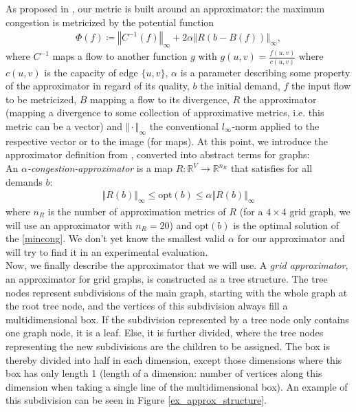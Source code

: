As proposed in \cite{nmfnlt}, our metric is built around an approximator: the maximum congestion is metricized by the potential function 
\begin{align}
\Phi(f)\coloneqq \left\Vert C^{-1}(f)\right\Vert_\infty+2\alpha\left\Vert R(b-B(f))\right\Vert_\infty, \tag{Def. of Potential}\label{def_pot}
\end{align}
 where $C^{-1}$ maps a flow to another function $g$ with $g(u,v)=\frac{f(u,v)}{c(u,v)}$ where $c(u,v)$ is the capacity of edge $\{u,v\}$, $\alpha$ is a parameter describing some property of the approximator in regard of its quality, $b$ the initial demand, $f$ the input flow to be metricized, $B$ mapping a flow to its divergence, $R$ the approximator (mapping a divergence to some collection of approximative metrics, i.e. this metric can be a vector) and $\Vert \cdot \Vert_\infty$ the conventional $l_\infty$-norm applied to the respective vector or to the image (for maps). At this point, we introduce the approximator definition from \cite{nmfnlt}, converted into abstract terms for graphs:\\
An \textit{$\alpha$-congestion-approximator} is a map $R:\mathbb{R}^V\rightarrow\mathbb{R}^{n_R}$ that satisfies for all demands $b$:
\begin{align}
\Vert R(b)\Vert_\infty \leq \text{opt}(b) \leq \alpha\Vert R(b)\Vert_\infty\label{def_approx}
\end{align}
where $n_R$ is the number of approximation metrics of $R$ (for a $4\times4$ grid graph, we will use an approximator with $n_R=20$) and $\text{opt}(b)$ is the optimal solution of the \ref{mincong}. We don't yet know the smallest valid $\alpha$ for our approximator and will try to find it in an experimental evaluation.\\
Now, we finally describe the approximator that we will use. 
A \textit{grid approximator}, an approximator for grid graphs, is constructed as a tree structure. The tree nodes represent subdivisions of the main graph, starting with the whole graph at the root tree node, and the vertices of this subdivision always fill a multidimensional box. If the subdivision represented by a tree node only contains one graph node, it is a leaf. Else, it is further divided, where the tree nodes representing the new subdivisions are the children to be assigned. The box is thereby divided into half in each dimension, except those dimensions where this box has only length 1 (length of a dimension: number of vertices along this dimension when taking a single line of the multidimensional box). An example of this subdivision can be seen in Figure \ref{ex_approx_structure}.\\
